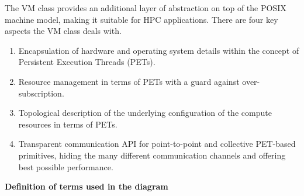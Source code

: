 

The VM class provides an additional layer of abstraction on top of the POSIX machine model, making it suitable for HPC applications. There are four key aspects the VM class deals with.

\begin{enumerate}

\item Encapsulation of hardware and operating system details within the concept of Persistent Execution Threads (PETs).

\item Resource management in terms of PETs with a guard against over-subscription.

\item Topological description of the underlying configuration of the compute resources in terms of PETs.

\item Transparent communication API for point-to-point and collective PET-based primitives, hiding the many different communication channels and offering best possible performance.

\end{enumerate}

\begin{center}
\end{center}


{\bf Definition of terms used in the diagram}


